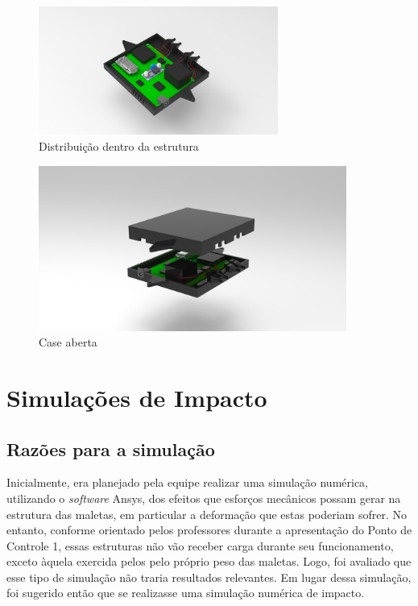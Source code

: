 \begin{figure}[H]
\centering
\includegraphics[width=0.7\textwidth]{figuras/cad/untitled.11.jpg}
\caption{Distribuição dentro da estrutura}
\label{fig:base02}
\end{figure}

\begin{figure}[H]
\centering
\includegraphics[width=0.9\textwidth]{figuras/cad/untitled.12.jpg}
\caption{Case aberta}
\label{fig:base03}
\end{figure}

\section{Simulações de Impacto}

\subsection{Razões para a simulação}

\par Inicialmente, era planejado pela equipe realizar uma simulação numérica, utilizando o \textit{software} Ansys, dos efeitos que esforços mecânicos possam gerar na estrutura das maletas, em particular a deformação que estas poderiam sofrer. No entanto, conforme orientado pelos professores durante a apresentação do Ponto de Controle 1, essas estruturas não vão receber carga durante seu funcionamento, exceto àquela exercida pelos pelo próprio peso das maletas. Logo, foi avaliado que esse tipo de simulação não traria resultados relevantes. Em lugar dessa simulação, foi sugerido então que se realizasse uma simulação numérica de impacto.

